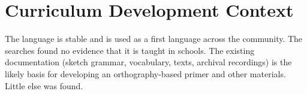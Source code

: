 \documentclass[12pt]{article}
\begin{document}
\section{Curriculum Development Context}
The language is stable and is used as a first language across the community. The searches found no evidence that it is taught in schools. The existing documentation (sketch grammar, vocabulary, texts, archival recordings) is the likely basis for developing an orthography-based primer and other materials. Little else was found.
\end{document}
